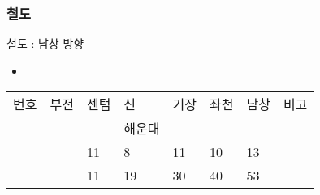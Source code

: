 \documentclass[aspectratio=1610,20pt,xcolor=pdftex,dvipsnames,table,handout]{beamer}
\begin{document}
		\begin{frame} [t,plain]
		\frametitle{철도}

			\begin{block} {철도 : 남창 방향 }
			\setlength{\leftmargini}{2em}			
			\begin{itemize}
				\item 
			\end{itemize}
			\end{block}						

		   \begin{center}
			\label{table:second}
			\setlength{\tabcolsep}{2pt}

			\footnotesize {


		     	\begin{tabularx}{\textwidth}{ 	m{} 	%
										m{} 	%
										m{}  	%
										m{}  	%
										m{}  	%
										m{}  	%
										m{}  	%
										m{}    	%
										}\hline

				번호  	& 부전		& 센텀  		& 신			& 기장	& 좌천		& 남창	 		&비고	\\ 
					  	& 			&			& 해운대	  	&		&			& 				&			\\ \hline \hline
																						
					  	& 			&11			& 8	 	 	&11		&10			&13 				&			\\ 
					  	& 			&11			& 19	 	 	&30		&40			&53 				&			\\ \hline \hline


\end{tabularx}}
\end{center}
\end{frame}
\end{document}
